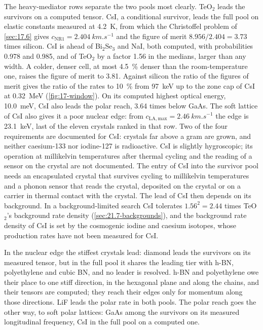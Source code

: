 The heavy-mediator rows separate the two pools most clearly. TeO$_2$ leads the survivors on a computed tensor. CsI, a conditional survivor, leads the full pool on elastic constants measured at \SI{4.2}{K}, from which the Christoffel problem of \cref{sec:17.6} gives $c_{\mathrm{NR1}} = \SI{2.404}{km.s^{-1}}$ and the figure of merit $8.956/2.404 = 3.73$ times silicon. CsI is ahead of Bi$_2$Se$_3$ and NaI, both computed, with probabilities 0.978 and 0.985, and of TeO$_2$ by a factor 1.56 in the medians, larger than any width. A colder, denser cell, at most \SI{4.5}{\percent} denser than the room-temperature one, raises the figure of merit to 3.81. Against silicon the ratio of the figures of merit gives the ratio of the rates to \SI{10}{\percent} from \SI{97}{keV} up to the zone cap of CsI at \SI{0.32}{MeV} (\cref{fig:17-window}). On its computed highest optical energy, \SI{10.0}{meV}, CsI also leads the polar reach, 3.64 times below GaAs. The soft lattice of CsI also gives it a poor nuclear edge: from $c_{\mathrm{LA,max}} = \SI{2.46}{km.s^{-1}}$ the edge is \SI{23.1}{keV}, last of the eleven crystals ranked in that row. Two of the four requirements are documented for CsI: crystals far above a gram are grown, and neither caesium-133 nor iodine-127 is radioactive. CsI is slightly hygroscopic; its operation at millikelvin temperatures after thermal cycling and the reading of a sensor on the crystal are not documented. The entry of CsI into the survivor pool needs an encapsulated crystal that survives cycling to millikelvin temperatures and a phonon sensor that reads the crystal, deposited on the crystal or on a carrier in thermal contact with the crystal. The lead of CsI then depends on its background. In a background-limited search CsI tolerates $1.56^2 = 2.44$ times TeO$_2$'s background rate density (\cref{sec:21.7-backgrounds}), and the background rate density of CsI is set by the cosmogenic iodine and caesium isotopes, whose production rates have not been measured for CsI.

In the nuclear edge the stiffest crystals lead: diamond leads the survivors on its measured tensor, but in the full pool it shares the leading tier with h-BN, polyethylene and cubic BN, and no leader is resolved. h-BN and polyethylene owe their place to one stiff direction, in the hexagonal plane and along the chains, and their tensors are computed; they reach their edges only for momentum along those directions. LiF leads the polar rate in both pools. The polar reach goes the other way, to soft polar lattices: GaAs among the survivors on its measured longitudinal frequency, CsI in the full pool on a computed one.

